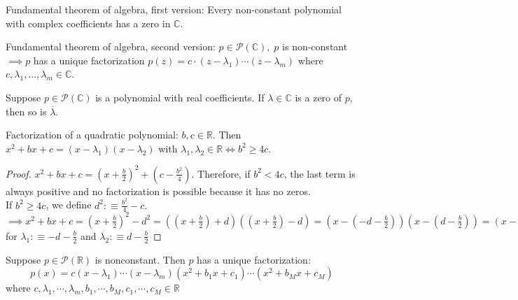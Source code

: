 \setcounter{thm}{11}
\begin{thm}
    \label{fundamental-theorem-of-algebra-first-version}
    Fundamental theorem of algebra, first version: Every non-constant polynomial with complex coefficients has a zero in $\mathbb{C}$.
\end{thm}

\begin{thm}
    \label{fundamental-theorem-of-algebra-second-version}
    Fundamental theorem of algebra, second version: $p \in \mathcal{P} (\mathbb{C}), \; p$ is non-constant $\implies p$ has a unique factorization $p(z)=c \cdot (z-\lambda_1) \cdots (z-\lambda_m)$ where $c, \lambda_1, \dots, \lambda_m \in \mathbb{C}$.
\end{thm}

\begin{thm}
    Suppose $p\in \mathcal{P} (\mathbb{C})$ is a polynomial with real coefficients. If $\lambda \in \mathbb{C}$ is a zero of $p$, then so is $\overline{\lambda}$.
\end{thm}

\begin{thm}
    Factorization of a quadratic polynomial:
    $b, c \in \mathbb{R}$. Then $x^2 + bx + c = (x-\lambda_1)(x-\lambda_2)$ with $\lambda_1, \lambda_2 \in \mathbb{R} \iff b^2 \geq 4c$.
\end{thm}
\begin{proof}
    $x^2+bx+c=(x+\frac{b}{2})^2+(c-\frac{b^2}{4})$. Therefore, if $b^2<4c$, the last term is always positive and no factorization is possible because it has no zeros. \\ 
    If $b^2 \geq 4c$, we define $d^2 :\equiv \frac{b^2}{4}-c.$ $\implies x^2+bx+c = \left (x+\frac{b}{2} \right )^2-d^2 = \left ( (x+\frac{b}{2}) +d \right) \left ( (x+\frac{b}{2}) - d \right) = \left (x-(-d -\frac{b}{2}) \right) \left (x-(d-\frac{b}{2})\right)=\left(x-\lambda_1 \right) \left(x-\lambda_2\right)$ for $\lambda_1 :\equiv -d-\frac{b}{2}$ and $\lambda_2 :\equiv d-\frac{b}{2}$
\end{proof}

\begin{thm}
    Suppose $p \in \mathcal{P}(\mathbb{R})$ is nonconstant. Then $p$ has a unique factorization:
    \begin{equation}
    p(x) = c(x-\lambda_1) \cdots (x-\lambda_m)(x^2+b_1x+c_1) \cdots (x^2+b_Mx+c_M)
    \end{equation}
where $c, \lambda_1, \cdots, \lambda_m, b_1, \cdots, b_M, c_1, \cdots, c_M \in \mathbb{R}$
\end{thm}

